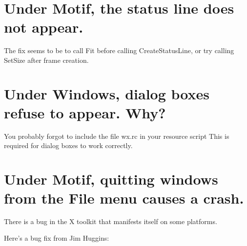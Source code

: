 \section{Under Motif, the status line does not appear.}

The fix seems to be to call Fit before calling CreateStatusLine,
or try calling SetSize after frame creation.

\section{Under Windows, dialog boxes refuse to appear. Why?}

You probably forgot to include the file wx.rc in your resource script
This is required for dialog boxes to work correctly.

\section{Under Motif, quitting windows from the File menu causes a crash.}

There is a bug in the X toolkit that manifests itself on some platforms.

Here's a bug fix from Jim Huggins:

